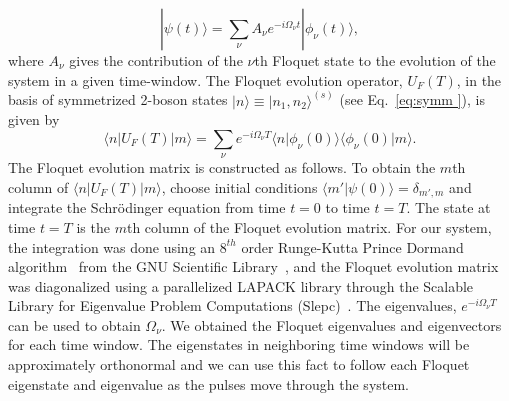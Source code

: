 \documentclass{article}
\begin{document}
%
\begin{equation}
 |\psi(t)\rangle={\sum_{\nu}}A_{\nu}e^{-i\Omega_\nu t}|\phi_\nu(t)\rangle,
\end{equation}
%
where $A_{\nu}$ gives the contribution of the ${\nu}$th Floquet state to the evolution of the system in a given time-window.  The Floquet evolution operator, $U_F(T)$, in the basis of symmetrized 2-boson states $\vert n \rangle \equiv \vert n_1,n_2\rangle^{(s)}$ (see Eq.~\ref{eq:symm }), is given by
%
\begin{equation}
\langle n \vert U_F(T)\vert m \rangle = \sum_{\nu} e^{-i\Omega_{\nu}T}\langle n \vert \phi_{\nu}(0)\rangle\langle \phi_{\nu}(0)\vert m \rangle.
\end{equation}
%
The Floquet evolution matrix is constructed as follows. To obtain the $m$th column of  $\langle n \vert U_F(T)\vert m \rangle$,  choose initial conditions ${\langle}m'|{\psi}(0){\rangle}={\delta}_{m',m}$ and integrate the Schr\"odinger equation from time $t=0$ to time $t=T$.  The state at time $t=T$ is the $m$th column of the Floquet evolution matrix.  For our system, the integration was  done using an $8^{th}$ order Runge-Kutta Prince Dormand algorithm~\cite{rkutta:pd} from the GNU Scientific Library~\cite{galassi:gsl}, and the Floquet evolution matrix was diagonalized using a parallelized LAPACK library through the Scalable Library for Eigenvalue Problem Computations (Slepc)~\cite{slepc}. The eigenvalues, $e^{-i\Omega_{\nu}T}$ can be used to obtain $\Omega_{\nu}$.  We obtained the Floquet eigenvalues and eigenvectors for each time window.  The eigenstates in neighboring time windows will be approximately orthonormal and we can use this fact to follow each Floquet eigenstate and eigenvalue as the pulses move through the system. 
\end{document}

